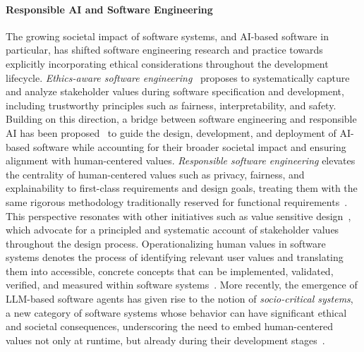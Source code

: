 \documentclass[sigconf,nonacm]{acmart}
\begin{document}
\paragraph{Responsible AI and Software Engineering}
The growing societal impact of software systems, and AI-based software in particular, has shifted software engineering research and practice towards explicitly incorporating ethical considerations throughout the development lifecycle.
\textit{Ethics-aware software engineering}~\cite{aydemir2018roadmap} proposes to systematically capture and analyze stakeholder values during software specification and development, including trustworthy principles such as fairness, interpretability, and safety.
Building on this direction, a bridge between software engineering and responsible AI has been proposed~\cite{lu2022roadmap,zhu2023software} to guide the design, development, and deployment of AI-based software while accounting for their broader societal impact and ensuring alignment with human-centered values.
\textit{Responsible software engineering} elevates the centrality of human-centered values such as privacy, fairness, and explainability to first-class requirements and design goals, treating them with the same rigorous methodology traditionally reserved for functional requirements~\cite{bennaceur2024responsible,schieferdecker2020responsible}.
This perspective resonates with other initiatives such as value sensitive design~\cite{friedman2017survey,zuber2024valuesensitive}, which advocate for a principled and systematic account of stakeholder values throughout the design process.
Operationalizing human values in software systems denotes the process of identifying relevant user values and translating them into accessible, concrete concepts that can be implemented, validated, verified, and measured within software systems~\cite{shahin2022operationalizing,whittle2021case,mougouei2018operationalizing,ferrario2023applying}.
More recently, the emergence of LLM-based software agents has given rise to the notion of \textit{socio-critical systems}, a new category of software systems whose behavior can have significant ethical and societal consequences, underscoring the need to embed human-centered values not only at runtime, but already during their development stages~\cite{baresi2024conceptual}.
\end{document}
